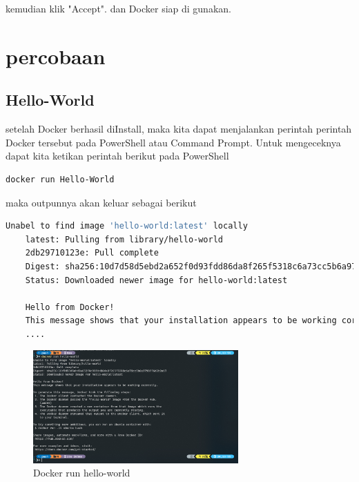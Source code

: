 \documentclass[11pt,a4paper]{article}
\begin{document}
kemudian klik "Accept". dan Docker siap di gunakan.

\section{percobaan}

\subsection{Hello-World}
setelah Docker berhasil diInstall, maka kita dapat menjalankan perintah perintah Docker tersebut pada PowerShell atau Command Prompt.
Untuk mengeceknya dapat kita ketikan perintah berikut pada PowerShell
\begin{lstlisting}[language=bash]
	docker run Hello-World
\end{lstlisting}
maka outpunnya akan keluar sebagai berikut
\begin{lstlisting}[language = bash]
	Unabel to find image 'hello-world:latest' locally
	latest: Pulling from library/hello-world
	2db29710123e: Pull complete
	Digest: sha256:10d7d58d5ebd2a652f0d93fdd86da8f265f5318c6a73cc5b6a9798ff6d2b2067
	Status: Downloaded newer image for hello-world:latest

	Hello from Docker!
	This message shows that your installation appears to be working correctly
	....
\end{lstlisting}
\begin{figure}[h]
	\centering
	\includegraphics[width = 0.7\textwidth]{Figure/asset/docker_run_helloworld.png}
	\caption{Docker run hello-world}
\end{figure}
\end{document}
